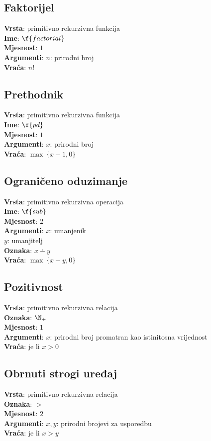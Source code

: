\subsection{Faktorijel}
\textbf{Vrsta}: primitivno rekurzivna funkcija\\
\textbf{Ime}: $\f{factorial}$\\
\textbf{Mjesnost}: $1$\\
\textbf{Argumenti}: $n$: prirodni broj\\
\textbf{Vraća}: $n!$

\subsection{Prethodnik}
\textbf{Vrsta}: primitivno rekurzivna funkcija\\
\textbf{Ime}: $\f{pd}$\\
\textbf{Mjesnost}: $1$\\
\textbf{Argumenti}: $x$: prirodni broj\\
\textbf{Vraća}: $\max\,\{x-1,0\}$

\subsection{Ograničeno oduzimanje}
\textbf{Vrsta}: primitivno rekurzivna operacija\\
\textbf{Ime}: $\f{sub}$\\
\textbf{Mjesnost}: $2$\\
\textbf{Argumenti}: $x$: umanjenik\\
$y$: umanjitelj\\
\textbf{Oznaka}: $x\dotminus y$\\
\textbf{Vraća}: $\max\,\{x-y,0\}$

\subsection{Pozitivnost}
\textbf{Vrsta}: primitivno rekurzivna relacija\\
\textbf{Oznaka}: $\N_+$\\
\textbf{Mjesnost}: $1$\\
\textbf{Argumenti}: $x$: prirodni broj promatran kao istinitosna vrijednost\\
\textbf{Vraća}: je li $x>0$

\subsection{Obrnuti strogi uređaj}
\textbf{Vrsta}: primitivno rekurzivna relacija\\
\textbf{Oznaka}: $>$\\
\textbf{Mjesnost}: $2$\\
\textbf{Argumenti}: $x,y$: prirodni brojevi za usporedbu\\
\textbf{Vraća}: je li $x>y$

